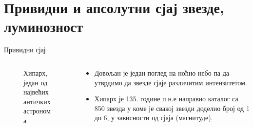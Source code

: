 \documentclass[aspectratio=169, xcolor=table, 10pt]{beamer}
\theoremstyle{definition}
\begin{document}
\section{Привидни и апсолутни сјај звезде, луминозност}

\begin{frame}{Привидни сјај}
  \begin{columns}[T]
    \begin{column}{0.35\textwidth}
      \begin{figure}
        \centering
        \captionsetup{width=\wd0}
        \caption{Хипарх, један од највећих античких астронома}
      \end{figure}
    \end{column}
    \begin{column}{0.65\textwidth}
      \begin{itemize}
        \item Довољан је један поглед на ноћно небо па да утврдимо да звезде сјаје различитим интензитетом.
        \item Хипарх је 135. године п.н.е направио каталог са 850 звезда у коме је свакој звезди доделио број од 1 до 6, у зависности од сјаја (магнитуде).

\end{itemize}
\end{column}
\end{columns}
\end{frame}
\end{document}
